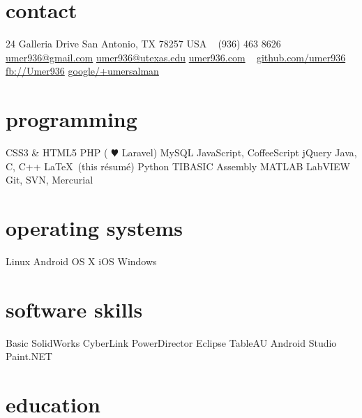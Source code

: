 \documentclass[]{friggeri-cv} %
\begin{document}


\begin{aside} %
	\section{contact}
	24 Galleria Drive
	San Antonio, TX 78257
	USA
	~
	(936) 463 8626
	~
	\href{mailto:umer936@gmail.com}{umer936@gmail.com}
	\href{mailto:umer936@utexas.edu}{umer936@utexas.edu}
	\href{http://umer936.com}{umer936.com}
	~
	\href{http://github.com/umer936}{github.com/umer936}
	\href{http://facebook.com/Umer936}{fb://Umer936}
	\href{http://google.com/+umersalman}{google/+umersalman}
	~
	\section{programming}
	CSS3 \& HTML5
	PHP ({\color{red} $\varheartsuit$} Laravel)
	MySQL
	JavaScript, CoffeeScript
	jQuery
	Java, C, C++
	\LaTeX \ (this r\'esum\'e)
	Python
	TIBASIC
	Assembly
	MATLAB
	LabVIEW
	Git, SVN, Mercurial
	~
	\section{operating systems}
	Linux
	Android
	OS X
	iOS
	Windows
	~
	\section{software skills}
	Basic SolidWorks
	CyberLink PowerDirector
	Eclipse
	TableAU
	Android Studio
	Paint.NET
\end{aside}


\section{education}
\end{document}
